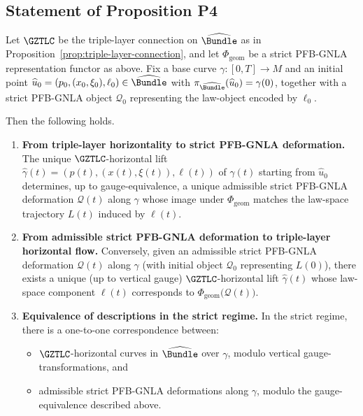 \documentclass[11pt]{book}
\theoremstyle{plain}
\theoremstyle{definition}
\begin{document}
\subsection*{Statement of Proposition P4}


\begin{proposition}
\label{prop:horizontal-flow-matching}
Let \(\GZTLC\) be the triple-layer connection on
\(\widehat{\Bundle}\) as in Proposition~\ref{prop:triple-layer-connection},
and let \(\Phi_{\mathrm{geom}}\) be a strict PFB-GNLA representation
functor as above.  Fix a base curve \(\gamma:[0,T]\to M\) and an initial
point \(\widehat{u}_0=(p_0,(x_0,\xi_0),\ell_0)\in\widehat{\Bundle}\)
with \(\pi_{\widehat{\Bundle}}(\widehat{u}_0)=\gamma(0)\), together
with a strict PFB-GNLA object \(\mathcal{Q}_0\) representing the
law-object encoded by \(\ell_0\).

Then the following holds.

\begin{enumerate}
  \item[\textnormal{(1)}] \textbf{From triple-layer horizontality to
        strict PFB-GNLA deformation.}
    The unique \(\GZTLC\)-horizontal lift
    \(\widehat{\gamma}(t)=(p(t),(x(t),\xi(t)),\ell(t))\) of \(\gamma(t)\)
    starting from \(\widehat{u}_0\) determines, up to gauge-equivalence,
    a unique admissible strict PFB-GNLA deformation
    \(\mathcal{Q}(t)\) along \(\gamma\) whose image under
    \(\Phi_{\mathrm{geom}}\) matches the law-space trajectory
    \(L(t)\) induced by \(\ell(t)\).
  \item[\textnormal{(2)}] \textbf{From admissible strict PFB-GNLA
        deformation to triple-layer horizontal flow.}
    Conversely, given an admissible strict PFB-GNLA deformation
    \(\mathcal{Q}(t)\) along \(\gamma\) (with initial object
    \(\mathcal{Q}_0\) representing \(L(0)\)), there exists a unique
    (up to vertical gauge) \(\GZTLC\)-horizontal lift
    \(\widehat{\gamma}(t)\) whose law-space component \(\ell(t)\)
    corresponds to \(\Phi_{\mathrm{geom}}\bigl(\mathcal{Q}(t)\bigr)\).
  \item[\textnormal{(3)}] \textbf{Equivalence of descriptions in the
        strict regime.}
    In the strict regime, there is a one-to-one correspondence between:
    \begin{itemize}
      \item \(\GZTLC\)-horizontal curves in \(\widehat{\Bundle}\) over
            \(\gamma\), modulo vertical gauge-transformations, and
      \item admissible strict PFB-GNLA deformations along \(\gamma\),
            modulo the gauge-equivalence described above.
    \end{itemize}
\end{enumerate}
\end{proposition}
\end{document}
